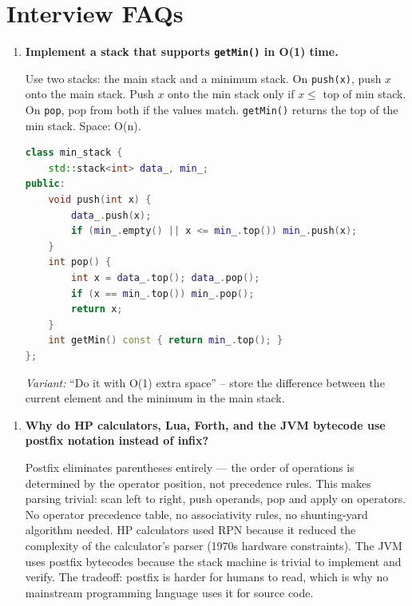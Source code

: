 \section{Interview FAQs}

\begin{enumerate}
\item \textbf{Implement a stack that supports \texttt{getMin()} in O(1) time.}

Use two stacks: the main stack and a minimum stack. On \texttt{push(x)}, push $x$ onto the main stack. Push $x$ onto the min stack only if $x \leq$ top of min stack. On \texttt{pop}, pop from both if the values match. \texttt{getMin()} returns the top of the min stack. Space: O(n).

\begin{lstlisting}[language=C++]
class min_stack {
    std::stack<int> data_, min_;
public:
    void push(int x) {
        data_.push(x);
        if (min_.empty() || x <= min_.top()) min_.push(x);
    }
    int pop() {
        int x = data_.top(); data_.pop();
        if (x == min_.top()) min_.pop();
        return x;
    }
    int getMin() const { return min_.top(); }
};
\end{lstlisting}

\textit{Variant:} ``Do it with O(1) extra space'' -- store the difference between the current element and the minimum in the main stack.
\end{enumerate}

\begin{enumerate}
\item \textbf{Why do HP calculators, Lua, Forth, and the JVM bytecode use postfix notation instead of infix?}

Postfix eliminates parentheses entirely — the order of operations is determined by the operator position, not precedence rules. This makes parsing trivial: scan left to right, push operands, pop and apply on operators. No operator precedence table, no associativity rules, no shunting-yard algorithm needed. HP calculators used RPN because it reduced the complexity of the calculator's parser (1970s hardware constraints). The JVM uses postfix bytecodes because the stack machine is trivial to implement and verify. The tradeoff: postfix is harder for humans to read, which is why no mainstream programming language uses it for source code.
\end{enumerate}

